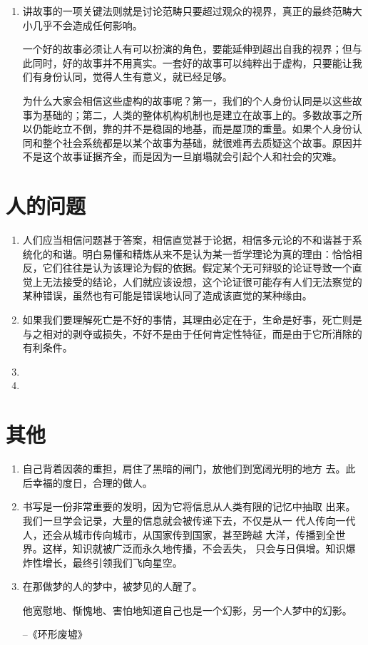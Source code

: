 \documentclass[UTF8]{ctexart}
\begin{document}
\begin{enumerate}
			\item 讲故事的一项关键法则就是讨论范畴只要超过观众的视界，真正的最终范畴大小几乎不会造成任何影响。
			
			一个好的故事必须让人有可以扮演的角色，要能延伸到超出自我的视界；但与此同时，好的故事并不用真实。一套好的故事可以纯粹出于虚构，只要能让我们有身份认同，觉得人生有意义，就已经足够。
			
			为什么大家会相信这些虚构的故事呢？第一，我们的个人身份认同是以这些故事为基础的；第二，人类的整体机构机制也是建立在故事上的。多数故事之所以仍能屹立不倒，靠的并不是稳固的地基，而是屋顶的重量。如果个人身份认同和整个社会系统都是以某个故事为基础，就很难再去质疑这个故事。原因并不是这个故事证据齐全，而是因为一旦崩塌就会引起个人和社会的灾难。
		\end{enumerate}
	\newpage
	
	\section{人的问题}
		
		\begin{enumerate}
			\item  人们应当相信问题甚于答案，相信直觉甚于论据，相信多元论的不和谐甚于系统化的和谐。明白易懂和精炼从来不是认为某一哲学理论为真的理由：恰恰相反，它们往往是认为该理论为假的依据。假定某个无可辩驳的论证导致一个直觉上无法接受的结论，人们就应该设想，这个论证很可能存有人们无法察觉的某种错误，虽然也有可能是错误地认同了造成该直觉的某种缘由。
			
			\item 如果我们要理解死亡是不好的事情，其理由必定在于，生命是好事，死亡则是与之相对的剥夺或损失，不好不是由于任何肯定性特征，而是由于它所消除的有利条件。
			\item 
			\item
		\end{enumerate}
	
	\newpage
	
	\section{其他}
	
		\begin{enumerate}
			
			\item 自己背着因袭的重担，肩住了黑暗的闸门，放他们到宽阔光明的地方
			去。此后幸福的度日，合理的做人。
			
			\item 书写是一份非常重要的发明，因为它将信息从人类有限的记忆中抽取
			出来。我们一旦学会记录，大量的信息就会被传递下去，不仅是从一
			代人传向一代人，还会从城市传向城市，从国家传到国家，甚至跨越
			大洋，传播到全世界。这样，知识就被广泛而永久地传播，不会丢失，
			只会与日俱增。知识爆炸性增长，最终引领我们飞向星空。
			\item 在那做梦的人的梦中，被梦见的人醒了。
			
			他宽慰地、惭愧地、害怕地知道自己也是一个幻影，另一个人梦中的幻影。
			
			\hfill --《环形废墟》
			
		\end{enumerate}
		
		
	
	
	
\end{document}
